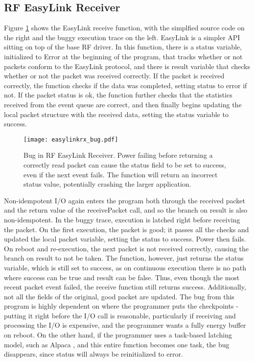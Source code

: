\subsection{RF EasyLink Receiver}
Figure \ref{fig:rf} shows the EasyLink receive function, with the simplfied source code on the right and the buggy execution trace on the left. EasyLink is a simpler API sitting on top of the base RF driver. In this function, there is a status variable, initialized to Error at the beginning of the program, that tracks whether or not packets conform to the EasyLink protocol, and there is result variable that checks whether or not the packet was received correctly. If the packet is received correctly, the function checks if the data was completed, setting status to error if not. If the packet status is ok, the function further checks that the statistics received from the event queue are correct, and then finally begins updating the local packet structure with the received data, setting the status variable to success.
\begin{figure}[h]
\centering
\texttt{[image: easylinkrx\_bug.pdf]}
\caption{Bug in RF EasyLink Receiver. Power failing before returning a correctly read packet can cause the status field to be set to success, even if the next event fails. The function will return an incorrect status value, potentially crashing the larger application.}
\label{fig:rf}
\end{figure}

Non-idempotent I/O again enters the program both through the received packet and the return value of the receivePacket call, and so the branch on result is also non-idempotent. In the buggy trace, execution is latched right before receiving the packet. On the first execution, the packet is good; it passes all the checks and updated the local packet variable, setting the status to success. Power then fails. On reboot and re-execution, the next packet is not received correctly, causing the branch on result to not be taken. The function, however, just returns the status variable, which is still set to success, as on continuous execution there is no path where success can be true and result can be false. Thus, even though the most recent packet event failed, the receive function still returns success. Additionally, not all the fields of the original, good packet are updated.
The bug from this program is highly dependent on where the programmer puts the checkpoints - putting it right before the I/O call is reasonable, particularly if receiving and processing the I/O is expensive, and the programmer wants a fully energy buffer on reboot. On the other hand, if the programmer uses a task-based latching model, such as Alpaca \cite{alpaca}, and this entire function becomes one task, the bug disappears, since status will always be reinitialized to error. 
 

